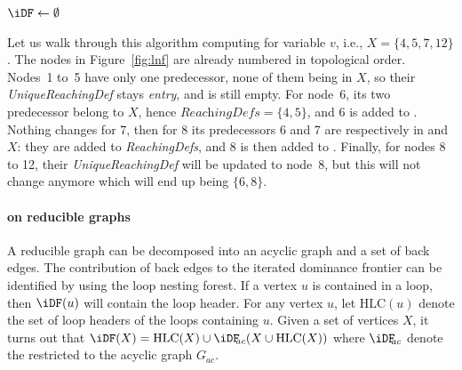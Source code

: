 {\begin{algorithm}
  \caption{%
  Ramalingam's algorithm for \iDF in an acyclic graph.}
  \label{algo:ramaIDF}

  $\iDF \gets \emptyset$\;
  \Return{$\iDF$}   
\end{algorithm}

Let us walk through this algorithm computing \iDF for variable $v$, i.e., $X = \{4,5,7,12\}$. The 
nodes in Figure~\ref{fig:lnf} are already numbered in topological order. Nodes~1 to~5 
have only one predecessor, none of them being in $X$, so their 
\textit{UniqueReachingDef} stays \textit{entry}, and \iDF is still empty. For 
node~6, its two predecessor belong to $X$, hence $\textit{ReachingDefs} = 
\{4,5\}$, and 6 is added to \iDF. Nothing changes for 7, then for 8 its 
predecessors 6 and 7 are respectively in \iDF and $X$: they are added to 
\textit{ReachingDefs}, and 8 is then added to \iDF. Finally, for nodes 8 to 12, 
their \textit{UniqueReachingDef} will be updated to node~8, but this will not 
change \iDF anymore which will end up being $\{6,8\}$.

\paragraph{\iDF on reducible graphs}

{\def\HLC{\mbox{HLC}}
A reducible graph can be decomposed into an acyclic graph and a set of back 
edges. The contribution of back edges to the iterated dominance frontier can be 
identified by using the loop nesting forest. If a vertex $u$ is contained in a 
loop, then $\iDF(u)$ will contain the loop header. For any vertex $u$, let 
$\HLC(u)$ denote the set of loop headers of the loops containing $u$. Given a 
set of vertices $X$, it turns out that $\iDF(X) = \HLC(X) \cup 
\iDFac(X \cup 
\HLC(X))$ where $\iDFac$ denote the \iDF restricted to the 
acyclic graph $G_{\textit{ac}}$.

}}
